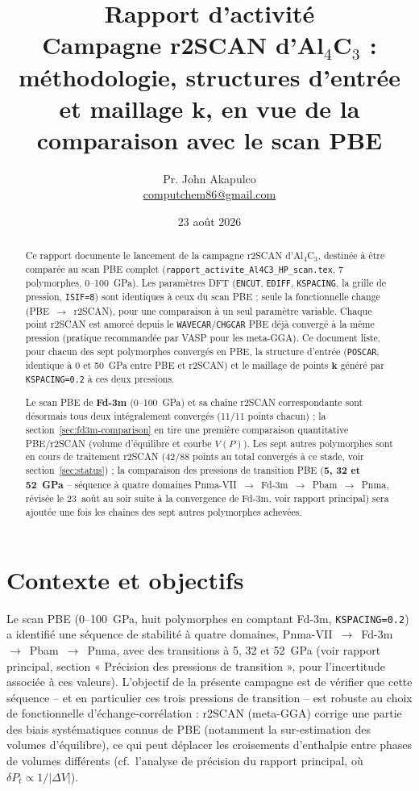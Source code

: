 \documentclass[11pt,a4paper]{article}
\title{\vspace{-1.5cm}Rapport d'activité\\[2pt]
\large Campagne r2SCAN d'Al$_4$C$_3$ : méthodologie, structures d'entrée et maillage
$\mathbf{k}$, en vue de la comparaison avec le scan PBE}
\author{Pr. John Akapulco \\ \small \href{mailto:computchem86@gmail.com}{computchem86@gmail.com}}
\date{23 août 2026}
\begin{document}
\maketitle
\vspace{-0.5cm}

\begin{abstract}
\noindent
Ce rapport documente le lancement de la campagne r2SCAN d'Al$_4$C$_3$, destinée à être
comparée au scan PBE complet (\texttt{rapport\_activite\_Al4C3\_HP\_scan.tex}, 7 polymorphes,
0--100~GPa). Les paramètres DFT (\texttt{ENCUT}, \texttt{EDIFF}, \texttt{KSPACING}, la grille de
pression, \texttt{ISIF=8}) sont identiques à ceux du scan PBE ; seule la fonctionnelle change
(PBE~$\to$~r2SCAN), pour une comparaison à un seul paramètre variable. Chaque point r2SCAN est
amorcé depuis le \texttt{WAVECAR}/\texttt{CHGCAR} PBE déjà convergé à la même pression (pratique
recommandée par VASP pour les meta-GGA). Ce document liste, pour chacun des sept polymorphes
convergés en PBE, la structure d'entrée (\texttt{POSCAR}, identique à 0 et 50~GPa entre PBE et
r2SCAN) et le maillage de points $\mathbf{k}$ généré par \texttt{KSPACING=0.2} à ces deux
pressions.

Le scan PBE de \textbf{Fd-3m} (0--100~GPa) et sa chaîne r2SCAN correspondante sont désormais
tous deux intégralement convergés (11/11 points chacun) ; la
section~\ref{sec:fd3m-comparison} en tire une première comparaison quantitative PBE/r2SCAN
(volume d'équilibre et courbe $V(P)$). Les sept autres polymorphes sont en cours de traitement
r2SCAN (42/88 points au total convergés à ce stade, voir section~\ref{sec:status}) ; la
comparaison des pressions de transition PBE (\textbf{5, 32 et 52~GPa} -- séquence à quatre
domaines Pnma-VII~$\to$~Fd-3m~$\to$~Pbam~$\to$~Pnma, révisée le 23~août au soir suite à la
convergence de Fd-3m, voir rapport principal) sera ajoutée une fois les chaînes des sept autres
polymorphes achevées.
\end{abstract}

\section{Contexte et objectifs}

Le scan PBE (0--100~GPa, huit polymorphes en comptant Fd-3m, \texttt{KSPACING=0.2}) a identifié
une séquence de stabilité à quatre domaines, Pnma-VII~$\to$~Fd-3m~$\to$~Pbam~$\to$~Pnma, avec
des transitions à 5, 32 et 52~GPa (voir rapport principal, section « Précision des pressions de
transition », pour l'incertitude associée à ces valeurs). L'objectif de la présente campagne est
de vérifier que cette séquence -- et en particulier ces trois pressions de transition -- est
robuste au choix de fonctionnelle
d'échange-corrélation : r2SCAN (meta-GGA) corrige une partie des biais systématiques connus de
PBE (notamment la sur-estimation des volumes d'équilibre), ce qui peut déplacer les croisements
d'enthalpie entre phases de volumes différents (cf.\ l'analyse de précision du rapport
principal, où $\delta P_t \propto 1/|\Delta V|$).
\end{document}
